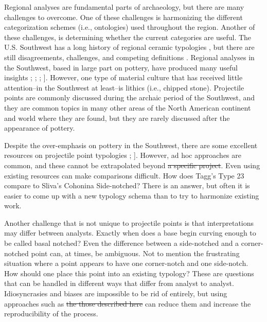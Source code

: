 \documentclass[a4paper]{article}
\providecommand{\DIFadd}[1]{{\protect\color{blue}\uwave{#1}}} %
\providecommand{\DIFdel}[1]{{\protect\color{red}\sout{#1}}}                      %
\providecommand{\DIFaddbegin}{} %
\providecommand{\DIFaddend}{} %
\providecommand{\DIFdelbegin}{} %
\providecommand{\DIFdelend}{} %
\begin{document}
Regional analyses are fundamental parts of archaeology, but there are many challenges to overcome. One of these challenges is harmonizing the different categorization schemes (i.e., ontologies) used throughout the region. Another of these challenges, is determining whether the current categories are useful. The U.S. Southwest has a long history of regional ceramic typologies \autocites[e.g.,][]{Colton1956-zy,gladwin1930a,Hargrave1932-ng,Kidder1915-ae,Martin1940-jg}, but there are still disagreements, challenges, and competing definitions \autocite{Duff1996-au}. Regional analyses in the Southwest, based in large part on pottery, have produced many useful insights \autocites[e.g.,][]{Bernardini2005-ue,Clark2019-bz}; \textcite{Hegmon2016-xw}; \textcite{Mills2013-wq}; \textcite{Peeples2018-ib}{]}. However, one type of material culture that has received little attention--in the Southwest at least--is lithics (i.e., chipped stone). Projectile points are commonly discussed during the archaic period of the Southwest, and they are common topics in many other areas of the North American continent and world where they are found, but they are rarely discussed after the appearance of pottery.

Despite the over-emphasis on pottery in the Southwest, there are some excellent resources on projectile point typologies \autocites[e.g.,][]{Hoffman1997-hb,Justice2002-cf,Loendorf2004-tp}; \textcite{Sliva2006-nq}{]}. However, ad hoc approaches are common, and these cannot \DIFaddbegin \DIFadd{easily }\DIFaddend be extrapolated beyond \DIFdelbegin \DIFdel{a specific project}\DIFdelend \DIFaddbegin \DIFadd{specific projects}\DIFaddend . Even using existing resources can make comparisons difficult. How does Tagg's \autocite*[p.111]{Tagg1994-wi} Type 23 compare to Sliva's \autocite[p.~35]{Sliva2006-nq} Cohonina Side-notched? There is an answer, but often it is easier to come up with a new typology schema than to try to harmonize existing work.

Another challenge that is not unique to projectile points is that interpretations may differ between analysts. Exactly when does a base begin curving enough to be called basal notched? Even the difference between a side-notched and a corner-notched point can, at times, be ambiguous. Not to mention the frustrating situation where a point appears to have one corner-notch and one side-notch. How should one place this point into an existing typology? These are questions that can be handled in different ways that differ from analyst to analyst. Idiosyncrasies and biases are impossible to be rid of entirely, but using approaches such as \DIFdelbegin \DIFdel{the those described here }\DIFdelend \DIFaddbegin \DIFadd{those described in this paper }\DIFaddend can reduce them and increase the reproducibility of the process.
\end{document}

